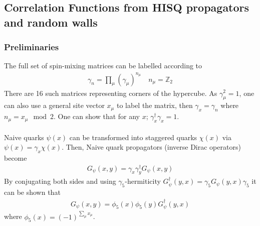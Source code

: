 \documentclass[a4paper,10pt]{article}
\numberwithin{equation}{section}
\begin{document}
\subsection{Correlation Functions from HISQ propagators and random walls}

\subsubsection{Preliminaries}
The full set of spin-mixing matrices can be labelled according to
\begin{align}
	\gamma_n = \prod_{\mu} \left( \gamma_{\mu} \right)^{n_{\mu}} \quad n_{\mu} = \mathbb{Z}_2
\end{align}
There are 16 such matrices representing corners of the hypercube. As $\gamma_{\mu}^2=1$, one can also use a general site vector $x_{\mu}$ to label the matrix, then $\gamma_x = \gamma_n$ where $n_{\mu} = x_{\mu} \mod 2$. One can show that for any $x$; $\gamma_x^{\dagger} \gamma_x = 1$.
\\ \\
Naive quarks $\psi(x)$ can be transformed into staggered quarks $\chi(x)$ via $\psi(x) = \gamma_x \chi(x)$. Then, Naive quark propagators (inverse Dirac operators) become
\begin{align}
	G_{\psi}(x,y) = \gamma_x\gamma^{\dagger}_y G_{\psi}(x,y)
\end{align}
By conjugating both sides and using $\gamma_5$-hermiticity $G^{\dagger}_{\psi}(y,x) = \gamma_5 G_{\psi}(y,x)\gamma_5$ it can be shown that
\begin{align}
	\label{eq:Gconj}
	G_{\psi}(x,y) = \phi_5(x)\phi_5(y) G^{\dagger}_{\psi}(y,x)
\end{align}
where $\phi_5(x) = (-1)^{\sum_{\mu} x_{\mu}}$.
\end{document}
